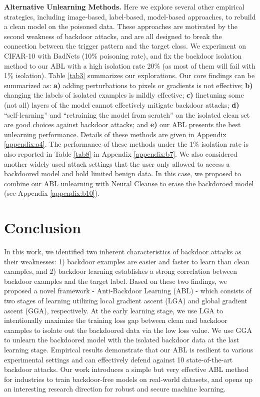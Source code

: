 \noindent\textbf{Alternative Unlearning Methods.} Here we explore several other empirical strategies, including image-based, label-based, model-based approaches, to rebuild a clean model on the poisoned data. These approaches are motivated by the second weakness of backdoor attacks, and are all designed to break the connection between the trigger pattern and the target class. We experiment on CIFAR-10 with BadNets (10\% poisoning rate), and fix the backdoor isolation method to our ABL with a high isolation rate 20\% (as most of them will fail with 1\% isolation).
Table \ref{tab3} summarizes our explorations. Our core findings can be summarized as: \textbf{a)} adding perturbations to pixels or gradients is not effective; \textbf{b)} changing the labels of isolated examples is mildly effective; \textbf{c)} finetuning some (not all) layers of the model cannot effectively mitigate backdoor attacks; \textbf{d)} ``self-learning” and ``retraining the model from scratch” on the isolated clean set are good choices against backdoor attacks; and \textbf{e)} our ABL presents the best unlearning performance. Details of these methods are given in Appendix \ref{appendix:a4}. The performance of these methods under the 1\% isolation rate is also reported in Table \ref{tab8} in Appendix \ref{appendix:b7}. We also considered another widely used attack settings that the user only allowed to access a backdoored model and hold limited benign data. In this case, we proposed to combine our ABL unlearning with Neural Cleanse \cite{wang2019neural} to erase the backdoroed model (see Appendix \ref{appendix:b10}).

\section{Conclusion} \label{sec:5}
In this work, we identified two inherent characteristics of backdoor attacks as their weaknesses: 1) backdoor examples are easier and faster to learn than clean examples, and 2) backdoor learning establishes a strong correlation between backdoor examples and the target label. Based on these two findings, we proposed a novel framework - Anti-Backdoor Learning (ABL) - which consists of two stages of learning utilizing local gradient ascent (LGA) and global gradient ascent (GGA), respectively. At the early learning stage, we use LGA to intentionally maximize the training loss gap between clean and backdoor examples to isolate out the backdoored data via the low loss value. We use GGA to unlearn the backdoored model with the isolated backdoor data at the last learning stage. Empirical results demonstrate that our ABL is resilient to various experimental settings and can effectively defend against 10 state-of-the-art backdoor attacks. 
Our work introduces a simple but very effective ABL method for industries to train backdoor-free models on real-world datasets, and opens up an interesting research direction for robust and secure machine learning.


